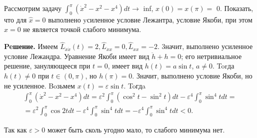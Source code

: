 \begin{task}
    Рассмотрим задачу $\int_0^\pi\left(\dot{x}^2-x^2-x^4\right) d t \rightarrow$ inf, $x(0)=x(\pi)=$ 0. Показать, что для $\hat{x}=0$ выполнено yсиленное условие Лежантра, условие Якоби, при этом $\hat{x}=0$ не является точкой слабого минимума.
    
    \textbf{Peшение.} Имеем $\hat{L}_{\dot{x} \dot{x}}(t)=2, \hat{L}_{\dot{x} x}=0, \hat{L}_{x x}=-2$. 3начит, выполнено усиленное условие Лежандра. Уравнение Якоби имеет вид $\ddot{h}+h=0$; его нетривиальное решение, зануляющееся при $t=0$, имеет вид $h(t)=a \sin t$, $a \neq 0$. Torда $h(t) \neq 0$ при $t \in(0, \pi)$, но $h(\pi)=0$. Значит, выполнено условие Якоби, но не усиленное.
    Boзьмем $x(t)=\varepsilon \sin t$. Toгдa
    $$
    \begin{gathered}
    \int_0^\pi\left(\dot{x}^2-x^2-x^4\right) d t=\varepsilon^2 \int_0^\pi\left(\cos ^2 t-\sin ^2 t\right) d t-\varepsilon^4 \int_0^\pi \sin ^4 t d t= \\
    =\varepsilon^2 \int_0^\pi \cos 2 t d t-\varepsilon^4 \int_0^\pi \sin ^4 t d t=-\varepsilon^4 \int_0^\pi \sin ^4 t d t<0 .
    \end{gathered}
    $$
    
    Так как $\varepsilon>0$ может быть сколь угодно мало, то слабого минимума нет.
\end{task}